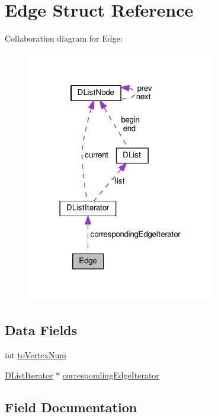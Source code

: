 \hypertarget{structEdge}{}\section{Edge Struct Reference}
\label{structEdge}


Collaboration diagram for Edge\+:\nopagebreak
\begin{figure}[H]
\begin{center}
\leavevmode
\includegraphics[width=234pt]{structEdge__coll__graph}
\end{center}
\end{figure}
\subsection*{Data Fields}
\begin{DoxyCompactItemize}
\item 
int \hyperlink{structEdge_affa54ce2dd876532f6b87fc049f5bd7d}{to\+Vertex\+Num}
\item 
\hyperlink{structDListIterator}{D\+List\+Iterator} $\ast$ \hyperlink{structEdge_a3cf54ba60e278bb26d3b39756f806ea1}{corresponding\+Edge\+Iterator}
\end{DoxyCompactItemize}


\subsection{Field Documentation}
